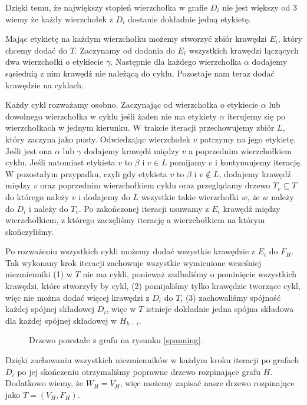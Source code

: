\documentclass[twoside,a4paper,12pt]{report} %
\theoremstyle{break}
\begin{document}
Dzięki temu, że największy stopień wierzchołka w grafie $D_i$ nie jest większy od 3 wiemy że każdy wierzchołek z $D_i$ dostanie dokładnie jedną etykietę.

Mając etykietę na każdym wierzchołku możemy stworzyć zbiór krawędzi $E_i$, który chcemy dodać do $T$. Zaczynamy od dodania do $E_i$ wszystkich krawędzi łączących dwa wierzchołki o etykiecie $\gamma$. Następnie dla każdego wierzchołka $\alpha$ dodajemy sąsiednią z nim krawędź nie należącą do cyklu. Pozostaje nam teraz dodać krawędzie na cyklach.

Każdy cykl rozważamy osobno. Zaczynając od wierzchołka o etykiecie $\alpha$ lub dowolnego wierzchołka w cyklu jeśli żaden nie ma etykiety $\alpha$ iterujemy się po wierzchołkach w jednym kierunku. W trakcie iteracji przechowujemy zbiór $L$, który zaczyna jako pusty. Odwiedzając wierzchołek $v$ patrzymy na jego etykietę. Jeśli jest ona $\alpha$ lub $\gamma$ dodajemy krawędź między $v$ a poprzednim wierzchołkiem cyklu. Jeśli natomiast etykieta $v$ to $\beta$ i $v \in L$ pomijamy $v$ i kontynuujemy iterację. W pozostałym przypadku, czyli gdy etykieta $v$ to $\beta$ i $v \notin L$, dodajemy krawędź między $v$ oraz poprzednim wierzchołkiem cyklu oraz przeglądamy drzewo $T_v \subseteq T$ do którego należy $v$ i dodajemy do $L$ wszystkie takie wierzchołki $w$, że $w$ należy do $D_i$ i należy do $T_v$. Po zakończonej iteracji usuwamy z $E_i$ krawędź między wierzchołkiem, z którego zaczęliśmy iterację a wierzchołkiem na którym skończyliśmy.

Po rozważeniu wszystkich cykli możemy dodać wszystkie krawędzie z $E_i$ do $F_H$. Tak wykonany krok iteracji zachowuje wszystkie wymienione wcześniej niezmienniki (1) w $T$ nie ma cykli, ponieważ zadbaliśmy o pominięcie wszystkich krawędzi, które stworzyły by cykl, (2) pomijaliśmy tylko krawędzie tworzące cykl, więc nie można dodać więcej krawędzi z $D_i$ do $T$, (3) zachowaliśmy spójność każdej spójnej składowej $D_i$, więc w $T$ istnieje dokładnie jedna spójna składowa dla każdej spójnej składowej w $H_{k-i}$. 

\begin{figure}[ht]
    \centering
    
    \caption{Drzewo powstałe z grafu na rysunku \ref{spanning}.}
    \label{spanning2}
\end{figure}

Dzięki zachowaniu wszystkich niezmienników w każdym kroku iteracji po grafach $D_i$ po jej skończeniu otrzymaliśmy poprawne drzewo rozpinające grafu $H$. Dodatkowo wiemy, że $W_H=V_H$, więc możemy zapisać nasze drzewo rozpinające jako $T=(V_H,F_H)$.
\end{document}
